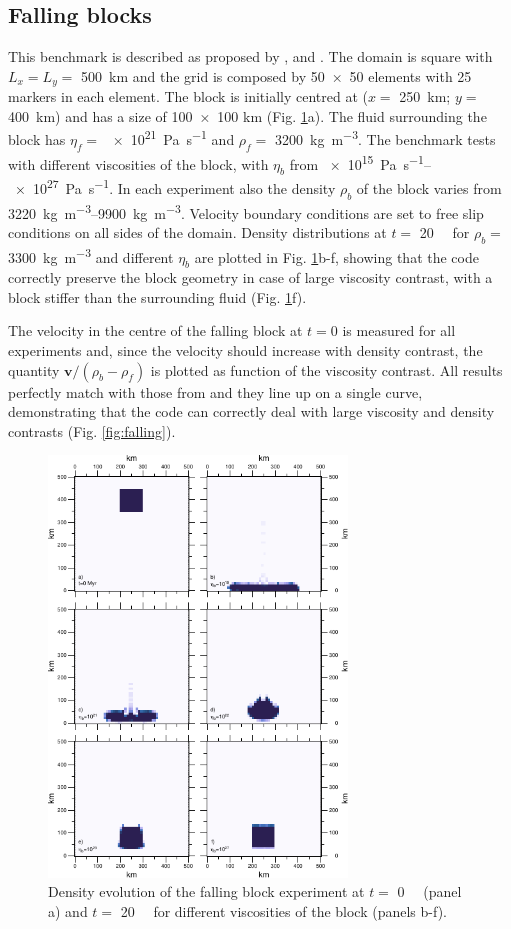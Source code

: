 \documentclass[hidelinks,10pt,a4paper]{article}
\begin{document}
\subsection{Falling blocks}\label{sec:block}
This benchmark is described as proposed by \citet{Gerya2003a}, \citet{Gerya2010b} and \citet{Thieulot2011}. The domain is square with $L_x=L_y=$ \SI{500}{\km}
and the grid is composed by \num{50x50} elements with 25 markers in each element. The block is initially centred at ($x=$ \SI{250}{\km}; $y=$ \SI{400}{\km})
and has a size of \num{100x100} km (Fig. \ref{fig:block}a). The fluid surrounding the block has $\eta_f=$ \SI{e21}{\pascal\per\s} and $\rho_f=$
\SI{3200}{\kg\per\cubic\m}. The benchmark tests with different viscosities of the block, with $\eta_b$ from \SIrange{e15}{e27}{\pascal\per\s}. In each
experiment also the density $\rho_b$ of the block varies from \SIrange{3220}{9900}{\kg\per\cubic\m}. Velocity boundary conditions are set to free slip
conditions on all sides of the domain. Density distributions at $t=$ \SI{20}{\mega\year} for $\rho_b=$ \SI{3300}{\kg\per\cubic\m} and different $\eta_b$
are plotted in Fig. \ref{fig:block}b-f, showing that the code correctly preserve the block geometry in case of large viscosity contrast, with a block stiffer
than the surrounding fluid (Fig. \ref{fig:block}f).

The velocity in the centre of the falling block at $t=0$ is measured for all experiments and, since the velocity should increase with density contrast, the
quantity $\bm{v}/(\rho_b-\rho_f)$ is plotted as function of the viscosity contrast. All results perfectly match with those from \citet{Gerya2010b} and they
line up on a single curve, demonstrating that the code can correctly deal with large viscosity and density contrasts (Fig. \ref{fig:falling}).

\begin{figure}
\noindent\includegraphics[width=300px]{./Figures/Block.pdf}
\centering
\caption{Density evolution of the falling block experiment at $t=$ \SI{0}{\mega\year} (panel a) and $t=$ \SI{20}{\mega\year} for different viscosities of the
block (panels b-f).}
\label{fig:block}
\end{figure}
\end{document}
